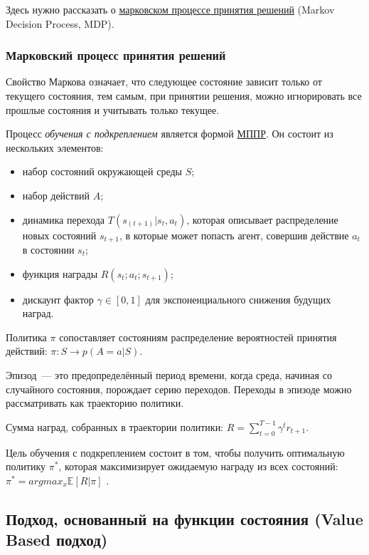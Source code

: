 Здесь нужно рассказать о \hyperref[acr:mdp]{марковском процессе принятия решений} (Markov Decision Process, MDP).

\subsubsection{Марковский процесс принятия решений}

Свойство Маркова означает, что следующее состояние зависит только от текущего состояния, тем самым, при принятии решения, можно игнорировать все прошлые состояния и учитывать только текущее.

Процесс {\itshape обучения с подкреплением} является формой \hyperref[acr:mdp]{МППР}. Он состоит из нескольких элементов:

\begin{itemize}
    \item набор состояний окружающей среды $S$;
    \item набор действий $A$;
    \item динамика перехода $T(s_{(t+1)}|s_t, a_t)$, которая описывает распределение новых состояний $s_{t+1}$, в которые может попасть агент, совершив действие $a_t$ в состоянии $s_t$;
    \item функция награды $R(s_t; a_t; s_{t+1})$;
    \item дискаунт фактор $\gamma \in [0, 1]$ для экспоненциального снижения будущих наград.
\end{itemize}

Политика $\pi$ сопоставляет состояниям распределение вероятностей принятия действий: ${\pi : S \to p(A = a|S)}$.

Эпизод~--- это предопределённый период времени, когда среда, начиная со случайного состояния, порождает серию переходов. Переходы в эпизоде можно рассматривать как траекторию политики.

Сумма наград, собранных в траектории политики: ${R = \sum_{t=0}^{T-1} \gamma^t r_{t+1}}$.

Цель обучения с подкреплением состоит в том, чтобы получить оптимальную политику ${\pi^*}$, которая максимизирует ожидаемую награду из всех состояний: ${\pi^* = argmax_x \mathbb{E} [R|\pi]}$ \cite{Otterlo2012ReinforcementLA}.

\subsection{Подход, основанный на функции состояния (Value Based подход)}

